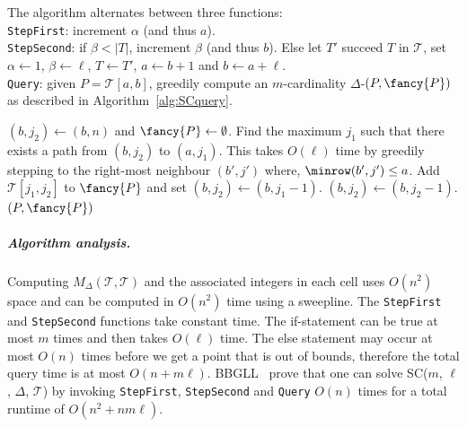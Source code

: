 The algorithm alternates between three functions: \\
%
 \texttt{StepFirst}: increment $\alpha$ (and thus $a$).\\
%
\texttt{StepSecond}: if $\beta < |T|$, increment $\beta$ (and thus $b$). 
%
%
Else let $T'$ succeed $T$ in $\mathcal{T}$, set $\alpha \gets 1$, $\beta \gets \ell$, $T \gets T'$, $a \gets b + 1$ and $b \gets a + \ell$. \\
%
 \texttt{Query}: given $P = \mathcal{T}[a, b]$, greedily compute an $m$-cardinality $\Delta$-\pathlet $(P, {\fancy{P}})$ as {described in Algorithm~\ref{alg:SCquery}}. 
%
%
 \begin{algorithm}[h]
    \caption{\texttt{Query}($P = \mathcal{T}[a, b]$, $m$, $\ell$, $\Delta$, $\mathcal{T})$ by~\cite{buchin2011detecting}}
   \label{alg:SCquery}
    \begin{algorithmic}
    \State $(b, j_2) \gets (b, n)$ and ${\fancy{P}} \gets \emptyset$. 
    \State Find the maximum $j_1$ such that there exists a path from $(b, j_2)$ to $(a, j_1)$. 
    \State This takes $O(\ell)$ time by greedily stepping to the right-most neighbour 
    $(b', j')$ where,
    \State $\minrow(b', j') \leq a$.
    \State Add    
    $\mathcal{T}[j_1, j_2]$ to ${\fancy{P}}$ and set $(b, j_2) \gets (b, j_1 - 1)$.
    \Else 
    \State $(b, j_2) \gets (b, j_2 - 1)$. 
    \EndIf
    \EndWhile
   \State  \Return $(P, {\fancy{P}})$
    \EndIf
    \end{algorithmic}
  \end{algorithm}
%
%
%
%
%
 \subparagraph{Algorithm analysis.}
 Computing $M_\Delta(\mathcal{T}, \mathcal{T})$ and the associated integers in each cell uses $O(n^2)$ space and can be computed in $O(n^2)$ time using a sweepline. 
%
  The \texttt{StepFirst} and \texttt{StepSecond} functions take constant time. 
 The if-statement can be true at most $m$ times and then takes  $O(\ell)$ time. The else statement may occur at most $O(n)$ times before we get a point that is out of bounds, therefore the total query time  is at most $O(n + m \ell)$. 
 BBGLL~\cite{buchin2011detecting} prove that one can solve SC($m$, $\ell$, $\Delta$, $\mathcal{T}$) by invoking \texttt{StepFirst}, \texttt{StepSecond} and \texttt{Query} $O(n)$ times for a total runtime of $O(n^2 + n m \ell)$. 
%
